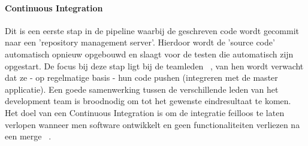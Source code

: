     
        \paragraph{Continuous Integration}
        Dit is een eerste stap in de pipeline waarbij de geschreven code wordt gecommit naar een 'repository management server'. Hierdoor wordt de 'source code' automatisch opnieuw opgebouwd en slaagt voor de testen die automatisch zijn opgestart. De focus bij deze stap ligt bij de teamleden ~\autocite{Fowler2006}, van hen wordt verwacht dat ze - op regelmatige basis - hun code pushen (integreren met de master applicatie). Een goede samenwerking tussen de verschillende leden van het development team is broodnodig om tot het gewenste eindresultaat te komen.
        Het doel van een Continuous Integration is om de integratie feilloos te laten verlopen wanneer men software ontwikkelt en geen functionaliteiten verliezen na een merge ~\autocite{Riti2018}.
        
